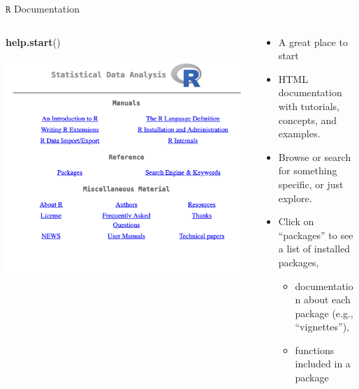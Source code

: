 \documentclass[
  11pt,
  ignorenonframetext,
]{beamer}
\newenvironment{Shaded}{\begin{snugshade}}{\end{snugshade}}
\newcommand{\FunctionTok}[1]{\textcolor[rgb]{0.13,0.29,0.53}{\textbf{#1}}}
\newcommand{\NormalTok}[1]{#1}
\providecommand{\tightlist}{%
  \setlength{\itemsep}{0pt}\setlength{\parskip}{0pt}}
\newlength\ShadedFrameSep
\newcommand{\ctop}{\vspace{\ShadedFrameSep}}  %
\newcommand{\R}{\texttt{R}}
\begin{document}
\begin{frame}[fragile]{\(\R\) Documentation}
\protect\hypertarget{r-documentation}{}
\begin{columns}[t,onlytextwidth]
\begin{column}{0.45\textwidth}
\begin{Shaded}
\begin{Highlighting}[]
\FunctionTok{help.start}\NormalTok{()}
\end{Highlighting}
\end{Shaded}

\includegraphics{images/R-screenshot-help-start}
\end{column}

\begin{column}{0.5\textwidth}
\ctop{}

\begin{itemize}
\tightlist
\item
  A great place to start
\item
  HTML documentation with tutorials, concepts, and examples.
\item
  Browse or search for something specific, or just explore.
\item
  Click on ``packages'' to see a list of installed packages,

  \begin{itemize}
  \tightlist
  \item
    documentation about each package (e.g., ``vignettes''),
  \item
    functions included in a package
  \end{itemize}
\end{itemize}
\end{column}
\end{columns}
\end{frame}
\end{document}
